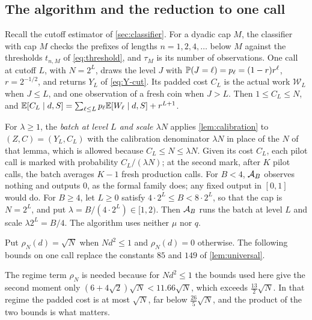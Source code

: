\subsection{The algorithm and the reduction to one call}

Recall the cutoff estimator of \cref{sec:classifier}. For a dyadic cap
$M$, the classifier with cap $M$ checks the prefixes of lengths
$n=1,2,4,\dots$ below $M$ against the thresholds $t_{n,M}$ of
\eqref{eq:threshold}, and $\tau_M$ is its number of observations. One call
at cutoff $L$, with $N=2^L$, draws the level $J$ with
$\mathbb P(J=\ell)=p_\ell=(1-r)r^\ell$, $r=2^{-1/2}$, and returns $Y_L$ of
\eqref{eq:Y-cut}. Its padded cost $C_L$ is the actual work
$\mathcal W_L$ when $J\le L$, and one observation of a fresh coin when
$J>L$. Then $1\le C_L\le N$, and
$\mathbb E[C_L\mid d,S]=\sum_{\ell\le L}p_\ell\mathbb E[W_\ell\mid d,S]+r^{L+1}$.

For $\lambda\ge1$, the \emph{batch at level $L$ and scale $\lambda N$}
applies \cref{lem:calibration} to $(Z,C)=(Y_L,C_L)$ with the calibration
denominator $\lambda N$ in place of the $N$ of that lemma, which is allowed
because $C_L\le N\le\lambda N$. Given its cost $C_L$, each pilot call is
marked with probability $C_L/(\lambda N)$; at the second mark, after $K$ pilot
calls, the batch averages $K-1$ fresh production calls. For $B<4$, $\mathcal A_B$
observes nothing and outputs $0$, as the formal family does; any fixed output
in $[0,1]$ would do. For $B\ge4$, let $L\ge0$ satisfy
$4\cdot2^L\le B<8\cdot2^L$, so that the cap is $N=2^L$, and put
$\lambda=B/(4\cdot2^L)\in[1,2)$. Then $\mathcal A_B$ runs the batch at level $L$
and scale $\lambda2^L=B/4$. The algorithm uses neither $\mu$ nor $q$.

Put $\rho_N(d)=\sqrt N$ when $Nd^2\le1$ and $\rho_N(d)=0$
otherwise. The following bounds on one call replace the constants $85$
and $149$ of \cref{lem:universal}.


The regime term $\rho_N$ is needed because for $Nd^2\le1$ the bounds
used here give the second moment only $(6+4\sqrt2)\sqrt N<11.66\sqrt N$,
which exceeds $\tfrac{13}{2}\sqrt N$. In that regime the padded cost is
at most $\sqrt N$, far below $\tfrac{26}{5}\sqrt N$, and the product of
the two bounds is what matters.

